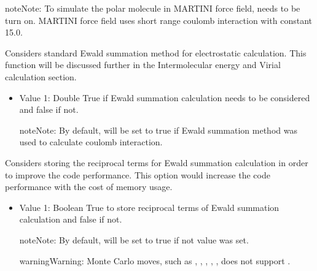 \documentclass[letterpaper,10pt,english]{sphinxmanual}
\begin{document}
\begin{description}
\begin{itemize}
\begin{sphinxadmonition}{note}{Note:}
\sphinxAtStartPar
To simulate the polar molecule in MARTINI force field,  needs to be turn on. MARTINI force field uses short range coulomb interaction with constant  15.0.
\end{sphinxadmonition}

\end{itemize}

\item[{\sphinxcode{\sphinxupquote{Ewald}}}] \leavevmode
\sphinxAtStartPar
Considers standard Ewald summation method for electrostatic calculation. This function will be discussed further in the Intermolecular energy and Virial calculation section.
\begin{itemize}
\item {} 
\sphinxAtStartPar
Value 1: Double \sphinxhyphen{} True if Ewald summation calculation needs to be considered and false if not.

\begin{sphinxadmonition}{note}{Note:}
\sphinxAtStartPar
By default,  will be set to true if Ewald summation method was used to calculate coulomb interaction.
\end{sphinxadmonition}

\end{itemize}

\item[{\sphinxcode{\sphinxupquote{CachedFourier}}}] \leavevmode
\sphinxAtStartPar
Considers storing the reciprocal terms for Ewald summation calculation in order to improve the code performance. This option would increase the code performance with the cost of memory usage.
\begin{itemize}
\item {} 
\sphinxAtStartPar
Value 1: Boolean \sphinxhyphen{} True to store reciprocal terms of Ewald summation calculation and false if not.

\begin{sphinxadmonition}{note}{Note:}
\sphinxAtStartPar
By default,  will be set to true if not value was set.
\end{sphinxadmonition}

\begin{sphinxadmonition}{warning}{Warning:}
\sphinxAtStartPar
Monte Carlo moves, such as , , , , ,  does not support .
\end{sphinxadmonition}


\end{itemize}
\end{description}
\end{document}
